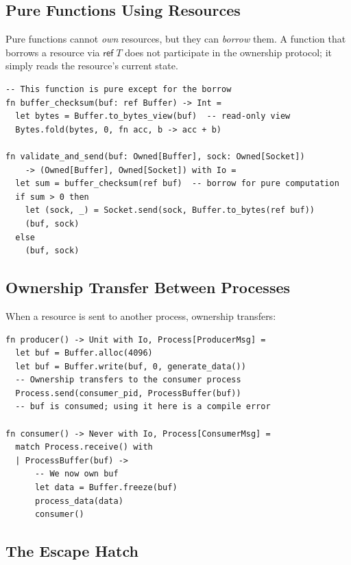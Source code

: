 \documentclass[11pt]{article}
\newcommand{\rref}{\mathsf{ref}}
\begin{document}
\subsection{Pure Functions Using Resources}

Pure functions cannot \emph{own} resources, but they can \emph{borrow}
them.  A function that borrows a resource via $\rref\; T$ does not
participate in the ownership protocol; it simply reads the resource's
current state.

\begin{lstlisting}[caption={Pure function borrowing a resource},label={lst:pure-borrow}]
-- This function is pure except for the borrow
fn buffer_checksum(buf: ref Buffer) -> Int =
  let bytes = Buffer.to_bytes_view(buf)  -- read-only view
  Bytes.fold(bytes, 0, fn acc, b -> acc + b)

fn validate_and_send(buf: Owned[Buffer], sock: Owned[Socket])
    -> (Owned[Buffer], Owned[Socket]) with Io =
  let sum = buffer_checksum(ref buf)  -- borrow for pure computation
  if sum > 0 then
    let (sock, _) = Socket.send(sock, Buffer.to_bytes(ref buf))
    (buf, sock)
  else
    (buf, sock)
\end{lstlisting}

\subsection{Ownership Transfer Between Processes}

When a resource is sent to another process, ownership transfers:

\begin{lstlisting}[caption={Ownership transfer between processes},label={lst:process-transfer}]
fn producer() -> Unit with Io, Process[ProducerMsg] =
  let buf = Buffer.alloc(4096)
  let buf = Buffer.write(buf, 0, generate_data())
  -- Ownership transfers to the consumer process
  Process.send(consumer_pid, ProcessBuffer(buf))
  -- buf is consumed; using it here is a compile error

fn consumer() -> Never with Io, Process[ConsumerMsg] =
  match Process.receive() with
  | ProcessBuffer(buf) ->
      -- We now own buf
      let data = Buffer.freeze(buf)
      process_data(data)
      consumer()
\end{lstlisting}

\subsection{The Escape Hatch}\label{sec:escape-hatch}
\end{document}
